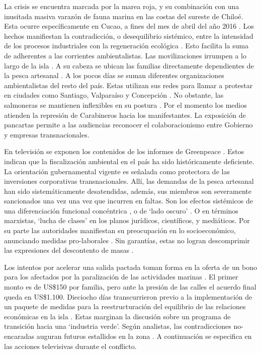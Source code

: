 \documentclass{textolivre}
\begin{document}
La crisis se encuentra marcada por la marea roja, y su combinación con una
inusitada masiva varazón de fauna marina en las costas del sureste de Chiloé. Esta
ocurre específicamente en Cucao, a fines del mes de abril del año 2016 \cite{cnnchile2016b}. 
Los hechos manifiestan la contradicción, o desequilibrio sistémico, entre la
intensidad de los procesos industriales con la regeneración ecológica \cite{Folke2016,Foster2016}. 
Esto facilita la suma de adherentes a las corrientes ambientalistas. Las
movilizaciones irrumpen a lo largo de la isla \cite{24horasa}. A su cabeza se ubican
las familias directamente dependientes de la pesca artesanal \cite{cabello2018}. 
A los pocos días se suman diferentes organizaciones ambientalistas
del resto del país. Estas utilizan sus redes para llamar a protestar en ciudades como
Santiago, Valparaíso y Concepción \cite{agenciaefe}. No obstante, las salmoneras
se mantienen inflexibles en su postura \cite{cooperativa2016}. Por el momento los
medios atienden la represión de Carabineros hacia los manifestantes. La exposición de
pancartas permite a las audiencias reconocer el colaboracionismo entre Gobierno y
empresas transnacionales.

En televisión se exponen los contenidos de los informes de Greenpeace \cite{cnnchile2016b}. 
Estos indican que la fiscalización ambiental en el país ha sido
históricamente deficiente. La orientación gubernamental vigente es señalada como
protectora de las inversiones corporativas transnacionales. Allí, las demandas de la pesca
artesanal han sido sistemáticamente desatendidas, además, sus miembros son
severamente sancionados una vez una vez que incurren en faltas. Son los efectos
sistémicos de una diferenciación funcional concéntrica \cite{Mascareo2018}, o de ‘lado
oscuro’ \cite{teubner2012}. O en términos marxistas, ‘lucha de clases’ \cite{marx2003,marx2013} 
en los planos jurídicos, científicos, y mediáticos. Por su parte las autoridades
manifiestan su preocupación en lo socioeconómico, anunciando medidas pro-laborales
\cite{t13a}. Sin garantías, estas no logran descomprimir las expresiones del
descontento de masas \cite{infante2016}.

Los intentos por acelerar una salida pactada toman forma en la oferta de un bono
para los afectados por la paralización de las actividades marinas \cite{24horasb}. El
primer monto es de US\$150 por familia, pero ante la presión de las calles el acuerdo final
queda en US\$1.100. Dieciocho días transcurrieron previo a la implementación de un
paquete de medidas para la reestructuración del equilibrio de las relaciones económicas
en la isla \cite{quense}. Estas marginan la discusión sobre un programa de transición
hacia una ‘industria verde’. Según analistas, las contradicciones no-encaradas auguran
futuros estallidos en la zona \cite{rios2016}. A continuación se especifica en las acciones
televisivas durante el conflicto.
\end{document}
